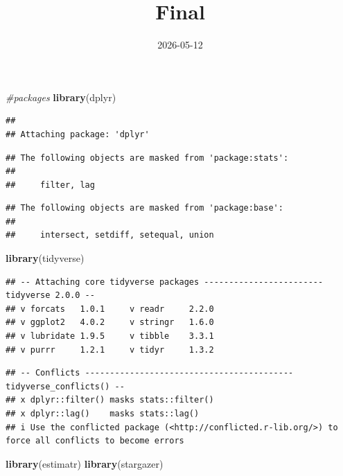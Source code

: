 \documentclass[
]{article}
\title{Final}
\author{}
\date{\vspace{-2.5em}2026-05-12}
\newenvironment{Shaded}{\begin{snugshade}}{\end{snugshade}}
\newcommand{\CommentTok}[1]{\textcolor[rgb]{0.56,0.35,0.01}{\textit{#1}}}
\newcommand{\FunctionTok}[1]{\textcolor[rgb]{0.13,0.29,0.53}{\textbf{#1}}}
\newcommand{\NormalTok}[1]{#1}
\begin{document}
\maketitle

\begin{Shaded}
\begin{Highlighting}[]
\CommentTok{\#packages}
\FunctionTok{library}\NormalTok{(dplyr)}
\end{Highlighting}
\end{Shaded}

\begin{verbatim}
## 
## Attaching package: 'dplyr'
\end{verbatim}

\begin{verbatim}
## The following objects are masked from 'package:stats':
## 
##     filter, lag
\end{verbatim}

\begin{verbatim}
## The following objects are masked from 'package:base':
## 
##     intersect, setdiff, setequal, union
\end{verbatim}

\begin{Shaded}
\begin{Highlighting}[]
\FunctionTok{library}\NormalTok{(tidyverse)}
\end{Highlighting}
\end{Shaded}

\begin{verbatim}
## -- Attaching core tidyverse packages ------------------------ tidyverse 2.0.0 --
## v forcats   1.0.1     v readr     2.2.0
## v ggplot2   4.0.2     v stringr   1.6.0
## v lubridate 1.9.5     v tibble    3.3.1
## v purrr     1.2.1     v tidyr     1.3.2
\end{verbatim}

\begin{verbatim}
## -- Conflicts ------------------------------------------ tidyverse_conflicts() --
## x dplyr::filter() masks stats::filter()
## x dplyr::lag()    masks stats::lag()
## i Use the conflicted package (<http://conflicted.r-lib.org/>) to force all conflicts to become errors
\end{verbatim}

\begin{Shaded}
\begin{Highlighting}[]
\FunctionTok{library}\NormalTok{(estimatr)}
\FunctionTok{library}\NormalTok{(stargazer)}
\end{Highlighting}
\end{Shaded}
\end{document}
